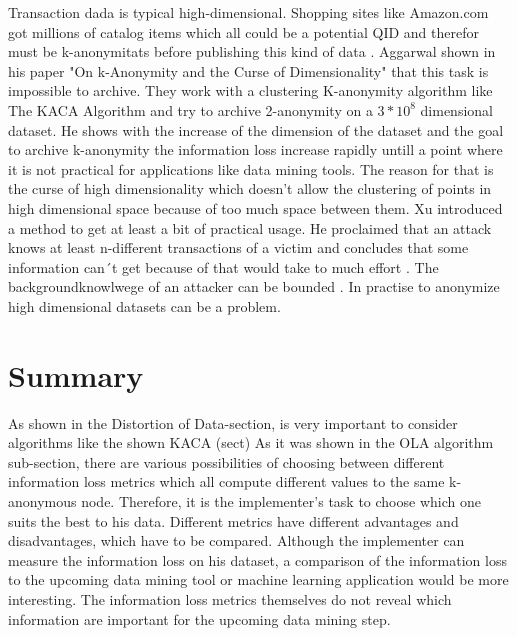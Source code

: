 \documentclass{llncs}
\begin{document}
Transaction dada is typical high-dimensional. Shopping sites like Amazon.com got millions of catalog items which all could be a potential QID and therefor must be k-anonymitats before publishing this kind of data \cite{wang2010privacy}. Aggarwal shown in his paper "On k-Anonymity and the Curse of Dimensionality" that this task is impossible to archive. They work with a clustering K-anonymity algorithm like The KACA Algorithm and try to archive 2-anonymity on a $3*10^8$ dimensional dataset. He shows with the increase of the dimension of the dataset and the goal to archive k-anonymity the information loss increase rapidly untill a point where it is not practical for applications like data mining tools. The reason for that is the curse of high dimensionality which doesn't allow the clustering of points in high dimensional space because of too much space between them. Xu introduced a method to get at least a bit of practical usage. He proclaimed that an attack knows at least n-different transactions of a victim and concludes that some information can´t get because of that would take to much effort \cite{xu2008publishing}. The backgroundknowlwege of an attacker can be bounded \cite{aggarwal2005k}. In practise to anonymize high dimensional datasets can be a problem.  

\section{Summary}
As shown  in the Distortion of Data-section, is very important to consider algorithms like the shown KACA (sect)
As it was shown in the OLA algorithm sub-section, there are various possibilities of choosing between different information loss metrics which all compute different values to the same k-anonymous node. Therefore, it is the implementer’s task to choose which one suits the best to his data. Different metrics have different advantages and disadvantages, which have to be compared. Although the implementer can measure the information loss on his dataset, a comparison of the information loss to the upcoming data mining tool or machine learning application would be more interesting. The information loss metrics themselves do not reveal which information are important for the upcoming data mining step. \\\\
\end{document}
